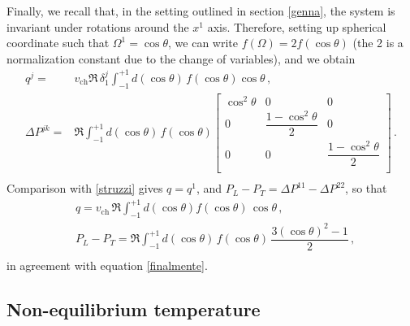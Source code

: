 \documentclass[a4paper, amsfonts, amssymb, amsmath, reprint, showkeys, nofootinbib, twoside, onecolumn, notitlepage]{revtex4-1}
\begin{document}
Finally, we recall that, in the setting outlined in section \ref{genna}, the system is invariant under rotations around the $x^1$ axis. Therefore, setting up spherical coordinate such that $\Omega^1=\cos \theta$, we can write $f(\Omega)=2f(\cos \theta)$ (the 2 is a normalization constant due to the change of variables), and we obtain
\begin{equation}
    \begin{split}
q^j={}& v_{\text{ch}} \mathfrak{R} \, \delta^j_1
\int_{-1}^{+1} d(\cos \theta) \, f(\cos\theta) \cos \theta  \, , \\
\Delta P^{jk}={}& \mathfrak{R} \int_{-1}^{+1} d(\cos \theta) \, f(\cos\theta) \begin{bmatrix}
\cos^2 \theta & 0 & 0 \\
0 & \dfrac{1-\cos^2\theta}{2} & 0 \\
0 & 0 & \dfrac{1-\cos^2\theta}{2} \\
\end{bmatrix} \, . \\ 
    \end{split}
\end{equation}
Comparison with \eqref{struzzi} gives $q=q^1$, and $P_L-P_T=\Delta P^{11}-\Delta P^{22}$, so that 
\begin{equation}\label{finalmenteancora}
    \begin{split}
& q= v_{\text{ch}} \, \mathfrak{R} \int_{-1}^{+1} d(\cos \theta) f(\cos\theta) \, \cos \theta \, , \\
& P_L{-}P_T= \mathfrak{R} \int_{-1}^{+1} d (\cos\theta) \, f(\cos\theta) \, \dfrac{3(\cos \theta)^2{-}1}{2} \,  , \\
    \end{split}
\end{equation}
in agreement with equation \eqref{finalmente}.

\subsection{Non-equilibrium temperature}
\end{document}

